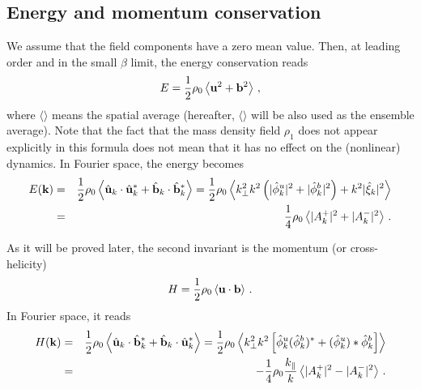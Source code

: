 \documentclass{jpp}
\def\be{\begin{equation}}
\def\ee{\end{equation}}
\def\ba{\begin{eqnarray}}
\def\ea{\end{eqnarray}}
\def\uu{{\bf u}}
\def\bbs{{\bf b}}
\def\kk{{\bf k}}
\def\kpa{k_{\parallel}}
\def\kpe{k_{\perp}}
\begin{document}
\subsection{Energy and momentum conservation} \label{sec23}
We assume that the field components have a zero mean value. Then, at leading order and in the small $\beta$ limit, the energy conservation reads
\be
E = \frac{1}{2} \rho_0 \left\langle \uu^2 + \bbs^2 \right\rangle \, ,
\ee
where $\langle  \rangle$ means the spatial average (hereafter, $\langle \rangle$ will be also used as the ensemble average). Note that the fact that the mass density field $\rho_1$ does not appear explicitly in this formula does not mean that it has no effect on the (nonlinear) dynamics. 
In Fourier space, the energy becomes
\ba
E(\kk) &=& \frac{1}{2} \rho_0 \left\langle \hat \uu_k \cdot \hat \uu_k^* + \hat \bbs_k \cdot \hat \bbs_k^* \right\rangle 
= \frac{1}{2} \rho_0 \left\langle \kpe^2 k^2 \left( \vert \hat \phi^u_k \vert^2 + \vert \hat \phi^b_k \vert^2 \right) + k^2 \vert \hat \xi_k \vert^2 \right\rangle  \nonumber \\
&=&  \frac{1}{4} \rho_0 \left\langle \vert A_k^+ \vert^2 + \vert A_k^- \vert^2 \right\rangle \, .
\ea

As it will be proved later, the second invariant is the momentum (or cross-helicity)
\be
H = \frac{1}{2} \rho_0 \left\langle \uu \cdot \bbs \right\rangle \, . 
\ee
In Fourier space, it reads
\ba
H(\kk) &=& \frac{1}{2} \rho_0 \left\langle \hat \uu_k \cdot \hat \bbs_k^* + \hat \bbs_k \cdot \hat \uu_k^* \right\rangle 
= \frac{1}{2} \rho_0 \left\langle \kpe^2 k^2 \left[\hat \phi^u_k (\hat \phi^b_k)^* + (\hat \phi^u_k)* \hat \phi^b_k \right] \right\rangle \nonumber \\
&=& - \frac{1}{4} \rho_0 \frac{\kpa}{k} \left\langle \vert A_k^+ \vert^2 - \vert A_k^- \vert^2 \right\rangle \, .
\ea


\end{document}
